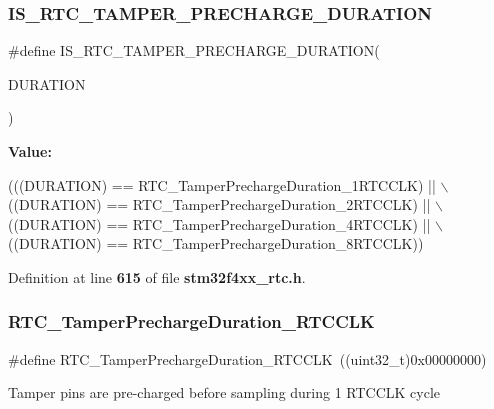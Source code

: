 \subsubsection{I\+S\+\_\+\+R\+T\+C\+\_\+\+T\+A\+M\+P\+E\+R\+\_\+\+P\+R\+E\+C\+H\+A\+R\+G\+E\+\_\+\+D\+U\+R\+A\+T\+I\+ON}
{\footnotesize\ttfamily \#define I\+S\+\_\+\+R\+T\+C\+\_\+\+T\+A\+M\+P\+E\+R\+\_\+\+P\+R\+E\+C\+H\+A\+R\+G\+E\+\_\+\+D\+U\+R\+A\+T\+I\+ON(\begin{DoxyParamCaption}\item[{}]{D\+U\+R\+A\+T\+I\+ON }\end{DoxyParamCaption})}

{\bfseries Value\+:}
\begin{DoxyCode}
(((DURATION) == RTC_TamperPrechargeDuration_1RTCCLK) || \(\backslash\)
                                                    ((DURATION) == 
      RTC_TamperPrechargeDuration_2RTCCLK) || \(\backslash\)
                                                    ((DURATION) == 
      RTC_TamperPrechargeDuration_4RTCCLK) || \(\backslash\)
                                                    ((DURATION) == 
      RTC_TamperPrechargeDuration_8RTCCLK))
\end{DoxyCode}


Definition at line \textbf{ 615} of file \textbf{ stm32f4xx\+\_\+rtc.\+h}.

\mbox{\label{group__RTC__Tamper__Pin__Precharge__Duration__Definitions_ga776e4f1a1a30d81e4333462ff49b10d6}} 
\subsubsection{R\+T\+C\+\_\+\+Tamper\+Precharge\+Duration\+\_\+R\+T\+C\+C\+LK}
{\footnotesize\ttfamily \#define R\+T\+C\+\_\+\+Tamper\+Precharge\+Duration\+\_\+R\+T\+C\+C\+LK~((uint32\+\_\+t)0x00000000)}

Tamper pins are pre-\/charged before sampling during 1 R\+T\+C\+C\+LK cycle 

